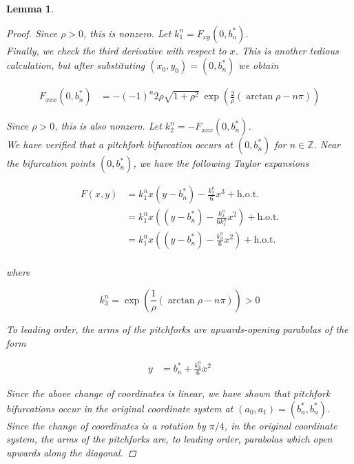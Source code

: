\documentclass[12pt]{article}
\def\Z{{\mathbb Z}}
\newtheorem{lemma}{Lemma}
\begin{document}
\begin{lemma}
\begin{proof}
Since $\rho > 0$, this is nonzero. Let $k_1^n = F_{xy}(0, b^*_n)$. \\

Finally, we check the third derivative with respect to $x$. This is another tedious calculation, but after substituting $(x_0, y_0) = \left(0, b^*_n \right)$ we obtain

\begin{align*}
F_{xxx}(0, b_n^*)
&= -(-1)^n 2 \rho \sqrt{1 + \rho^2} \: \exp{\left(\frac{2}{\rho} (\arctan \rho - n \pi) \right)}
\end{align*}

Since $\rho > 0$, this is also nonzero. Let $k_2^n = -F_{xxx}(0, b^*_n)$. \\

We have verified that a pitchfork bifurcation occurs at $(0, b^*_n)$ for $n \in \Z$. Near the bifurcation points $(0, b_n^*)$, we have the following Taylor expansions

\begin{align*}
F(x, y) &= k_1^n x (y - b_n^*) - \frac{k_2^n}{6} x^3 + \text{h.o.t.} \\
&= k_1^n x \left( (y - b_n^*) - \frac{k_2^n}{6 k_1^n } x^2 \right) + \text{h.o.t.} \\
&= k_1^n x \left( (y - b_n^*) - \frac{k_3^n}{6} x^2 \right) + \text{h.o.t.} \\
\end{align*}

where

\begin{equation*}
k_3^n = \exp{\left(\frac{1}{\rho} (\arctan \rho - n \pi) \right)} > 0
\end{equation*}

To leading order, the arms of the pitchforks are upwards-opening parabolas of the form 

\begin{align*}
y &= b_n^* + \frac{k_3^n}{6} x^2
\end{align*}

Since the above change of coordinates is linear, we have shown that pitchfork bifurcations occur in the original coordinate system at $(a_0, a_1) = (b_n^*, b_n^*)$. Since the change of coordinates is a rotation by $\pi/4$, in the original coordinate system, the arms of the pitchforks are, to leading order, parabolas which open upwards along the diagonal.

\end{proof}
\end{lemma}
\end{document}
